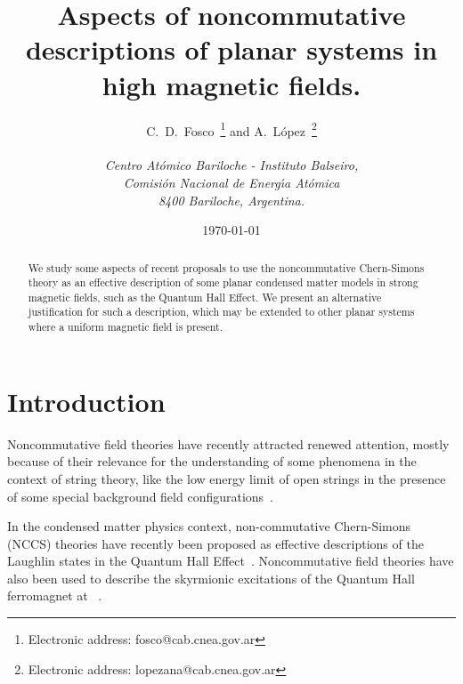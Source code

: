 \documentclass[a4paper,12pt]{article}
\begin{document}
\title{Aspects of noncommutative descriptions of planar systems in
  high magnetic fields.}  \author{C.~D.~Fosco~\footnote{Electronic
    address: fosco@cab.cnea.gov.ar} and
A.~L{\'o}pez~\footnote{Electronic
    address: lopezana@cab.cnea.gov.ar}
  \\ \\
  {\normalsize\it Centro At{\'o}mico Bariloche - Instituto
Balseiro,}\\
  {\normalsize\it Comisi{\'o}n Nacional de Energ{\'\i}a
At{\'o}mica}\\
  {\normalsize\it 8400 Bariloche, Argentina.}}  \date{\today}
\maketitle
\begin{abstract}
\noindent
We study some aspects of recent proposals to use the noncommutative
Chern-Simons theory as an effective description of some planar
condensed matter models in strong magnetic fields, such as the
Quantum
Hall Effect.  We present an alternative justification for such a
description, which may be extended to other planar systems where a
uniform magnetic field is present.
\end{abstract}
\bigskip \newpage
\section{Introduction}

Noncommutative field theories have recently attracted renewed
attention, mostly because of their relevance for the understanding
of
some phenomena in the context of string theory, like the low energy
limit of open strings in the presence of some special background
field
configurations~\cite{castellani,DN}.

In the condensed matter physics context, non-commutative
Chern-Simons
(NCCS) theories have recently been proposed as effective
descriptions
of the Laughlin states in the Quantum Hall
Effect~\cite{susskind,PP,KS}.  Noncommutative field theories have
also
been used to describe the skyrmionic excitations of the Quantum
Hall
ferromagnet at \coordHE{}~\cite{PA, LMR}.
\end{document}

